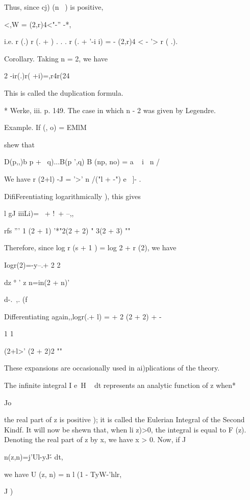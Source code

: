 Thus, since cj) (n~ ) is positive,

<,W = (2,r)4<"-'' -*,

i.e. r (.) r (. + ) . . . r (. + '-i i) = - (2,r)4 < - '> r ( .).

Corollary. Taking n = 2, we have

2 -ir(.)r( +i)=,r4r(24

This is called the duplication formula.

* Werke, iii. p. 149. The case in which n - 2 was given by Legendre.

%
%

Example. If (, o) = EMlM

shew that

D(p,,)b p + \ q)...B(p ',q) B (np, no) = a ~ i \ n /


We have r (2+l) -J = '>' n /("l + -") e~ ]- .

DifiFerentiating logarithmically ), this gives

l gJ iiiLi)= \ + !\ + --,,

rfs ''' 1 (2 + 1) '*"2(2 + 2) " 3(2 + 3) ""

Therefore, since log r (s + 1 ) = log 2 + r (2), we have

Iogr(2)=-y--.+ 2 2

dz ° ' z n=in(2 + n)'

d-. \,,. (f

Differentiating again,,logr(.+ l) = + 2 (2 + 2) + -

1 1

 (2+l>' (2 + 2)2 ""

These expansions are occasionally used in ai)plications of the theory.

The infinite integral I e~H ~ dt represents an analytic function of z
when*

Jo

the real part of z is positive ); it is called the Eulerian
Integral of the Second Kindf. It will now be shewn that, when li z)>0,
the integral is equal to F (z). Denoting the real part of z by x, we
have x > 0. Now, if J

n(z,n)=j'Ul-yJ\'- dt,

we have U (z, n) = n l (1 - TyW-'hlr,

J )

